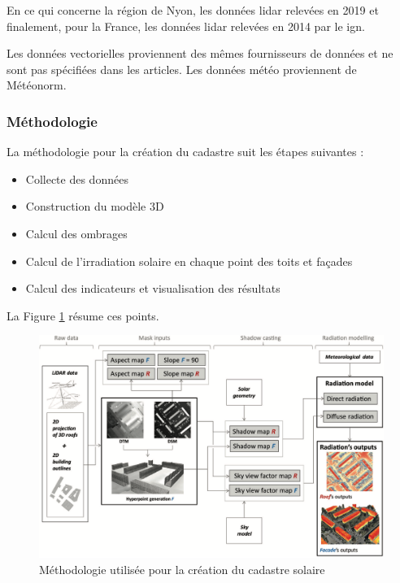 \par{En ce qui concerne la région de Nyon, les données \gls{lidar} relevées en 2019 \cite{etat_de_vaud_lidar_nodate} et finalement, pour la France, les données \gls{lidar} relevées en 2014 \cite{ign_ign_nodate} par le \acrshort{ign}.
\par{Les données vectorielles proviennent des mêmes fournisseurs de données et ne sont pas spécifiées dans les articles. Les données météo proviennent de Météonorm.}


\subsubsection{Méthodologie}

\par{La méthodologie \cite{desthieux_solar_2018} pour la création du cadastre suit les étapes suivantes :}
\begin{itemize}
    \item Collecte des données
    \item Construction du modèle 3D
    \item Calcul des ombrages
    \item Calcul de l'irradiation solaire en chaque point des toits et façades
    \item Calcul des indicateurs et visualisation des résultats
\end{itemize}

\par{La Figure \ref{fig:cadastre_solaire_methodologie} résume ces points.}
\begin{figure}[H]
    \centering
    \includegraphics[width=1\linewidth]{02-main//figures/cadastre_solaire_methodologie.png}
    \caption{Méthodologie utilisée pour la création du cadastre solaire \cite{desthieux_solar_2018}}
    \label{fig:cadastre_solaire_methodologie}
\end{figure}

}
